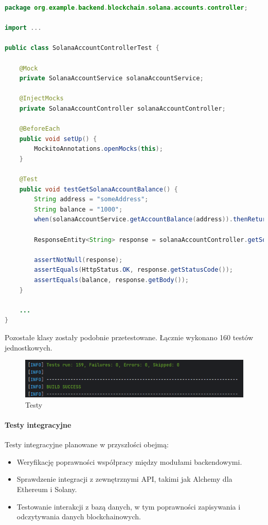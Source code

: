 \begin{lstlisting}[language=Java, style=JavaStyle]
package org.example.backend.blockchain.solana.accounts.controller;

import ...

public class SolanaAccountControllerTest {

    @Mock
    private SolanaAccountService solanaAccountService;

    @InjectMocks
    private SolanaAccountController solanaAccountController;

    @BeforeEach
    public void setUp() {
        MockitoAnnotations.openMocks(this);
    }

    @Test
    public void testGetSolanaAccountBalance() {
        String address = "someAddress";
        String balance = "1000";
        when(solanaAccountService.getAccountBalance(address)).thenReturn(Optional.of(balance));

        ResponseEntity<String> response = solanaAccountController.getSolanaAccountBalance(address);

        assertNotNull(response);
        assertEquals(HttpStatus.OK, response.getStatusCode());
        assertEquals(balance, response.getBody());
    }

    ...
}
\end{lstlisting}

Pozostałe klasy zostały podobnie przetestowane. Łącznie wykonano 160 testów jednostkowych.

\begin{figure}[htb]
    \centering
    \includegraphics[width=0.8\linewidth]{./obrazy/tests.png}
    \caption{Testy}
    \label{fig:Testy}
\end{figure}

\paragraph{Testy integracyjne}

Testy integracyjne planowane w przyszłości obejmą:
\begin{itemize}
    \item Weryfikację poprawności współpracy między modułami backendowymi.
    \item Sprawdzenie integracji z zewnętrznymi API, takimi jak Alchemy dla Ethereum i Solany.
    \item Testowanie interakcji z bazą danych, w tym poprawności zapisywania i odczytywania danych blockchainowych.
\end{itemize}

